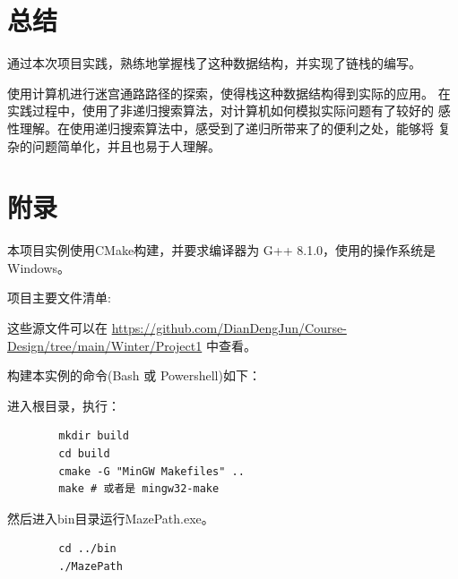 \documentclass{ctexart}
\begin{document}
    \section{总结}

    通过本次项目实践，熟练地掌握栈了这种数据结构，并实现了链栈的编写。
    
    使用计算机进行迷宫通路路径的探索，使得栈这种数据结构得到实际的应用。
    在实践过程中，使用了非递归搜索算法，对计算机如何模拟实际问题有了较好的
    感性理解。在使用递归搜索算法中，感受到了递归所带来了的便利之处，能够将
    复杂的问题简单化，并且也易于人理解。

    \section{附录}

    本项目实例使用CMake构建，并要求编译器为 G++ 8.1.0，使用的操作系统是 Windows。
    
    项目主要文件清单:
    

    这些源文件可以在 \url{https://github.com/DianDengJun/Course-Design/tree/main/Winter/Project1} 中查看。
    
    构建本实例的命令(Bash 或 Powershell)如下：
    
    进入根目录，执行：
    
    \begin{verbatim}
        mkdir build
        cd build
        cmake -G "MinGW Makefiles" ..
        make # 或者是 mingw32-make
    \end{verbatim}

    然后进入bin目录运行MazePath.exe。

    \begin{verbatim}
        cd ../bin
        ./MazePath
    \end{verbatim}
\end{document}
